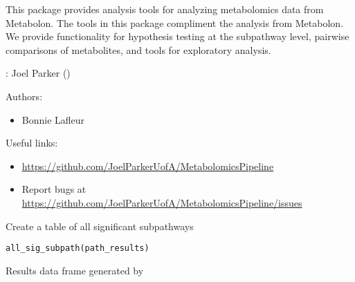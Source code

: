\documentclass[a4paper]{book}
\begin{document}
%
\begin{Description}
This package provides analysis tools for analyzing metabolomics data from Metabolon. The tools in this package compliment the analysis from Metabolon. We provide functionality for hypothesis testing at the subpathway level, pairwise comparisons of metabolites, and tools for exploratory analysis.
\end{Description}
%
\begin{Author}
: Joel Parker  ()

Authors:
\begin{itemize}

\item{} Bonnie Lafleur 

\end{itemize}


\end{Author}
%
\begin{SeeAlso}
Useful links:
\begin{itemize}

\item{} \url{https://github.com/JoelParkerUofA/MetabolomicsPipeline}
\item{} Report bugs at \url{https://github.com/JoelParkerUofA/MetabolomicsPipeline/issues}

\end{itemize}


\end{SeeAlso}
%
\begin{Description}
Create a table of all significant subpathways
\end{Description}
%
\begin{Usage}
\begin{verbatim}
all_sig_subpath(path_results)
\end{verbatim}
\end{Usage}
%
\begin{Arguments}
\begin{ldescription}
\item[\code{path\_results}] Results data frame generated by
\end{ldescription}
\end{Arguments}
\end{document}
